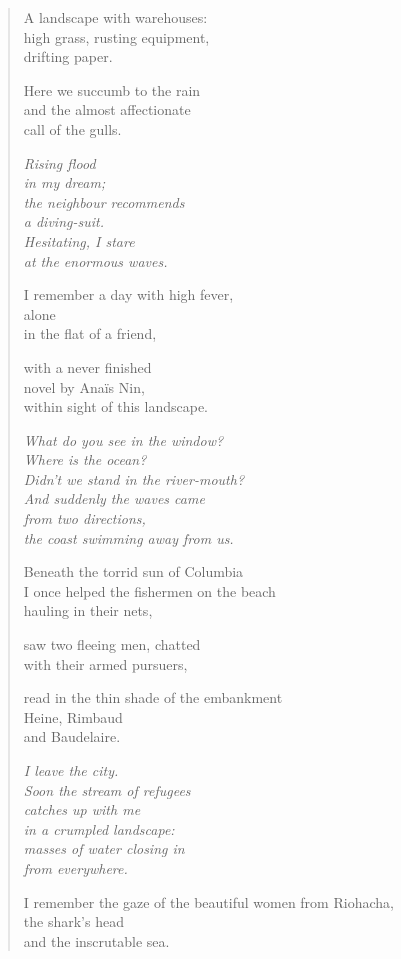 \cleartorecto


\begin{verse}

A landscape with warehouses:\\
high grass, rusting equipment,\\
drifting paper.

Here we succumb to the rain\\
and the almost affectionate\\
call of the gulls.

{\itshape
Rising flood\\
in my dream;\\
the neighbour recommends\\
a diving-suit.\\
Hesitating, I stare\\
at the enormous waves.}

I remember a day with high fever,\\
alone\\
in the flat of a friend,

with a never finished\\
novel by Anaïs Nin,\\
within sight of this landscape.

{\itshape
What do you see in the window?\\
Where is the ocean?\\
Didn't we stand in the river-mouth?\\
And suddenly the waves came\\
from two directions,\\
the coast swimming away from us.}

Beneath the torrid sun of Columbia\\
I once helped the fishermen on the beach\\
hauling in their nets,

saw two fleeing men, chatted\\
with their armed pursuers,

read in the thin shade of the embankment\\
Heine, Rimbaud\\
and Baudelaire.

{\itshape
I leave the city.\\
Soon the stream of refugees\\
catches up with me\\
in a crumpled landscape:\\
masses of water closing in\\
from everywhere.}

I remember the gaze of the beautiful women from Riohacha,\\
the shark's head\\
and the inscrutable sea.

\end{verse}
